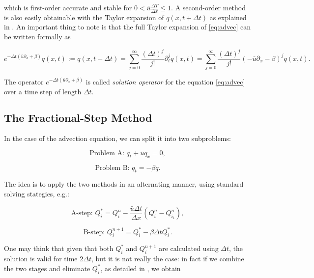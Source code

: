 \documentclass[journal,onecolumn]{IEEEtran}
\begin{document}
which is first-order accurate and stable for $0<\bar{u}\frac{\Delta T}{\Delta x}\leq1$.
A second-order method is also easily obtainable with the Taylor expansion of $q(x,t+\Delta t)$ as explained in \cite{leveque}. An important thing to note is that the full Taylor expansion of \eqref{eq:advec} can be written formally as

\begin{equation}
	e^{-\Delta t(\bar{u}\partial_x+\beta)}q(x,t):=q(x,t+\Delta t)=\sum_{j=0}^{\infty}\frac{(\Delta t)^j}{j!}\partial_t^jq(x,t)=\sum_{j=0}^{\infty}\frac{(\Delta t)^j}{j!}(-\bar{u}\partial_x-\beta)^jq(x,t).
\end{equation}

The operator $e^{-\Delta t(\bar{u}\partial_x+\beta)}$ is called \textit{solution operator} for the equation \eqref{eq:advec} over a time step of length $\Delta t$.

\subsection{The Fractional-Step Method}

In the case of the advection equation, we can split it into two subproblems:

\begin{equation}\label{eq:probA}
	\text{Problem A: } q_t+\bar{u}q_x=0,
\end{equation}

\begin{equation}\label{eq:probB}
	\text{Problem B: } q_t = -\beta q.
\end{equation}

The idea is to apply the two methods in an alternating manner, using standard solving stategies, e.g.:

\begin{equation}\label{eq:stepA}
	\text{A-step: } Q_i^* = Q_i^n - \frac{\bar{u}\Delta t}{\Delta x} (Q_i^n-Q_{i_1}^n),
\end{equation}

\begin{equation}\label{eq:stepB}
	\text{B-step: } Q_i^{n+1} = Q_i^*-\beta\Delta tQ_i^*.
\end{equation}

One may think that given that both $Q_i^*$ and $Q_i^{n+1}$ are calculated using $\Delta t$, the solution is valid for time $2\Delta t$, but it is not really the case: in fact if we combine the two stages and eliminate $Q_i^*$, as detailed in \cite{leveque}, we obtain
\end{document}

